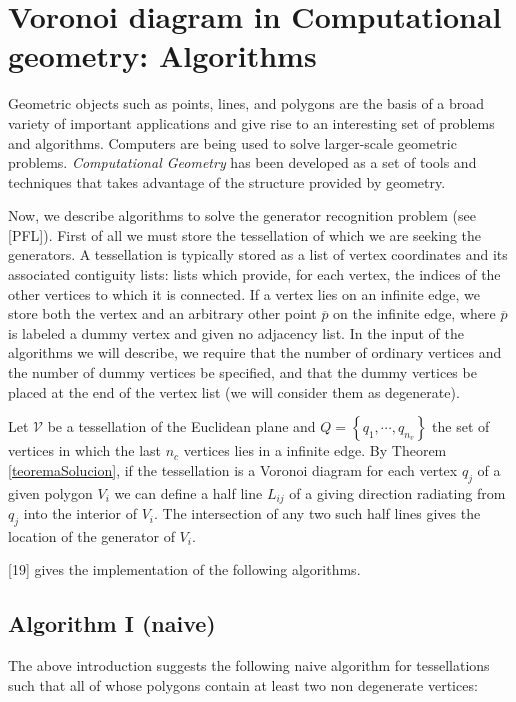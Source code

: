 \documentclass[a4paper,12pt]{article}
\newtheorem*{Condition 1}{Condition 1}
\newtheorem*{Condition 2}{Condition 2}
\theoremstyle{definition}
\theoremstyle{remark}
\begin{document}
\section{Voronoi diagram in Computational geometry: Algorithms}

Geometric objects such as points, lines, and polygons are the basis of a broad variety of important applications and give rise to an interesting set of problems and algorithms. Computers are being used to solve larger-scale geometric problems. \emph{Computational Geometry} has been developed as a set of tools and techniques that takes advantage of the structure provided by geometry.


Now, we describe algorithms to solve the generator recognition problem (see [PFL]). First of all we must store the tessellation of which we are seeking the generators. A tessellation is typically stored as a list of vertex coordinates and its associated contiguity lists: lists which provide, for each vertex, the indices of the other vertices to which it is connected. If a vertex lies on an infinite edge, we  store both the vertex and an arbitrary other point $\overline{p}$ on the infinite edge, where $\overline{p}$ is labeled a dummy vertex and given no adjacency list. In the input of the algorithms we will describe, we require that the number of ordinary vertices and the number of dummy vertices be specified, and that the dummy vertices be placed at the end of the vertex list (we will consider them as degenerate).


Let $\mathcal{V}$ be a tessellation of the Euclidean plane and $Q=\left\lbrace q_1, \cdots ,q_{n_{v}} \right\rbrace $ the set of vertices  in which the last $n_{c}$ vertices lies in a infinite edge. By Theorem \ref{teoremaSolucion}, if the tessellation is a Voronoi diagram for each vertex $q_j$ of a given polygon $V_i$ we can define a half line $L_{ij}$ of a giving direction radiating from $q_j$ into the interior of $V_i$. The intersection of any two such half lines gives the location of the generator of $V_i$. 


[19] gives the implementation of the following algorithms. 

\subsection*{Algorithm I (naive)} 
The above introduction suggests the following naive algorithm for tessellations such that all of whose polygons contain at least two non degenerate vertices:
\end{document}
